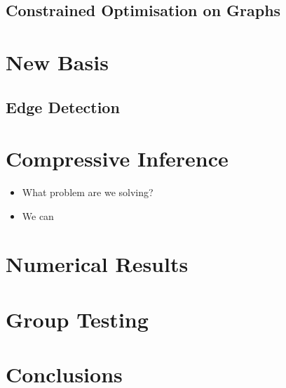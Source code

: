 \documentclass{article}
\begin{document}
\subsection{Constrained Optimisation on Graphs}\label{sec:opt-on-graphs}

\section{New Basis}

\subsection{Edge Detection}

\section{Compressive Inference}
\begin{itemize}
\item What problem are we solving?
\item We can 
\end{itemize}

\section{Numerical Results}

\section{Group Testing}

\section{Conclusions}
\end{document}
